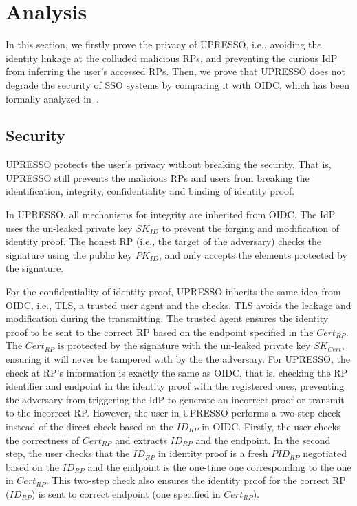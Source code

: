 ﻿\section{Analysis}
\label{sec:analysis}
In this section, we firstly prove the privacy of UPRESSO, i.e., avoiding the identity linkage at the colluded malicious RPs,
and preventing the curious IdP from inferring the user's accessed RPs.
Then, we prove that UPRESSO does not degrade the security of SSO systems by comparing it with OIDC, which has been formally analyzed in~\cite{FettKS17}.


\subsection{Security}
\label{subsec:security}
UPRESSO protects the user's privacy without breaking the security. That is, UPRESSO still prevents the malicious RPs and users from breaking the identification, integrity, confidentiality and binding of identity proof.

In UPRESSO, all mechanisms for integrity are inherited from OIDC. The IdP uses the un-leaked private key $SK_{ID}$ to prevent the forging and modification of identity proof. The honest RP (i.e., the target of the adversary) checks the signature using the public key $PK_{ID}$, and only accepts the elements protected by the signature.

For the confidentiality of identity proof, UPRESSO inherits the same idea from OIDC, i.e., TLS, a trusted user agent and the checks. TLS avoids the leakage and modification during the transmitting. The trusted agent ensures the identity proof to be sent to the correct RP based on the endpoint specified in the $Cert_{RP}$. The  $Cert_{RP}$ is protected by the signature with the un-leaked private key $SK_{Cert}$, ensuring it  will never be tampered with by the the adversary. For UPRESSO, the check at RP's information is exactly the same as OIDC, that is, checking the RP identifier and endpoint in the identity proof with the registered ones, preventing the adversary from triggering the IdP to
generate an incorrect proof or transmit to the incorrect RP. However, the user in UPRESSO performs a two-step check instead of the direct check based on the $ID_{RP}$ in OIDC. Firstly, the user checks the correctness of $Cert_{RP}$ and extracts  $ID_{RP}$ and the endpoint. In the second step, the user checks that the $ID_{RP}$ in identity proof is a fresh $PID_{RP}$ negotiated based on the $ID_{RP}$ and the endpoint is the one-time one corresponding to the one in $Cert_{RP}$. This two-step check also ensures the identity proof for the correct RP ($ID_{RP}$) is sent to correct endpoint (one specified in $Cert_{RP}$).

